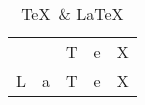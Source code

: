 \documentclass{article}
\begin{document}
\begin{table}
	\centering
	\begin{tabular}{|c|c|c|c|c|}
		\hline
			& 	& T & e & X \\
		L 	& a & T & e & X \\
		\hline
	\end{tabular}
	\caption{\TeX\ \& \LaTeX}
\end{table}
\end{document}
